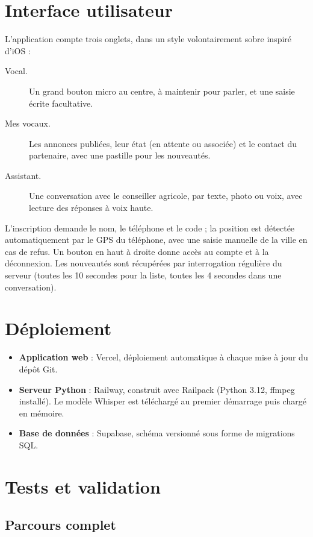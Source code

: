 \documentclass[12pt,a4paper]{article}
\begin{document}
\section{Interface utilisateur}

L'application compte trois onglets, dans un style volontairement sobre inspiré d'iOS :
\begin{description}
  \item[Vocal.] Un grand bouton micro au centre, à maintenir pour parler, et une saisie écrite
  facultative.
  \item[Mes vocaux.] Les annonces publiées, leur état (en attente ou associée) et le contact du
  partenaire, avec une pastille pour les nouveautés.
  \item[Assistant.] Une conversation avec le conseiller agricole, par texte, photo ou voix, avec
  lecture des réponses à voix haute.
\end{description}

L'inscription demande le nom, le téléphone et le code ; la position est détectée automatiquement
par le GPS du téléphone, avec une saisie manuelle de la ville en cas de refus. Un bouton en haut à
droite donne accès au compte et à la déconnexion. Les nouveautés sont récupérées par interrogation
régulière du serveur (toutes les 10 secondes pour la liste, toutes les 4 secondes dans une
conversation).

\section{Déploiement}

\begin{itemize}
  \item \textbf{Application web} : Vercel, déploiement automatique à chaque mise à jour du dépôt Git.
  \item \textbf{Serveur Python} : Railway, construit avec Railpack (Python 3.12, ffmpeg installé). Le
  modèle Whisper est téléchargé au premier démarrage puis chargé en mémoire.
  \item \textbf{Base de données} : Supabase, schéma versionné sous forme de migrations SQL.
\end{itemize}

\section{Tests et validation}

\subsection{Parcours complet}
\end{document}
